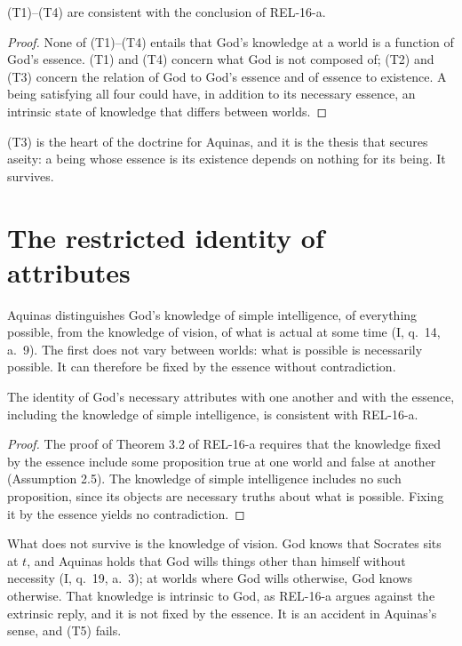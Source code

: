 \documentclass{situationist-preprint}
\begin{document}
\begin{proposition}\label{p:survive}
(T1)--(T4) are consistent with the conclusion of REL-16-a.
\end{proposition}

\begin{proof}
None of (T1)--(T4) entails that God's knowledge at a world is a function of God's essence. (T1) and (T4) concern what God is not composed of; (T2) and (T3) concern the relation of God to God's essence and of essence to existence. A being satisfying all four could have, in addition to its necessary essence, an intrinsic state of knowledge that differs between worlds.
\end{proof}

(T3) is the heart of the doctrine for Aquinas, and it is the thesis that secures aseity: a being whose essence is its existence depends on nothing for its being. It survives.

\section{The restricted identity of attributes}

Aquinas distinguishes God's knowledge of simple intelligence, of everything possible, from the knowledge of vision, of what is actual at some time (I, q.~14, a.~9). The first does not vary between worlds: what is possible is necessarily possible. It can therefore be fixed by the essence without contradiction.

\begin{proposition}\label{p:restricted}
The identity of God's necessary attributes with one another and with the essence, including the knowledge of simple intelligence, is consistent with REL-16-a.
\end{proposition}

\begin{proof}
The proof of Theorem 3.2 of REL-16-a requires that the knowledge fixed by the essence include some proposition true at one world and false at another (Assumption 2.5). The knowledge of simple intelligence includes no such proposition, since its objects are necessary truths about what is possible. Fixing it by the essence yields no contradiction.
\end{proof}

What does not survive is the knowledge of vision. God knows that Socrates sits at $t$, and Aquinas holds that God wills things other than himself without necessity (I, q.~19, a.~3); at worlds where God wills otherwise, God knows otherwise. That knowledge is intrinsic to God, as REL-16-a argues against the extrinsic reply, and it is not fixed by the essence. It is an accident in Aquinas's sense, and (T5) fails.
\end{document}
